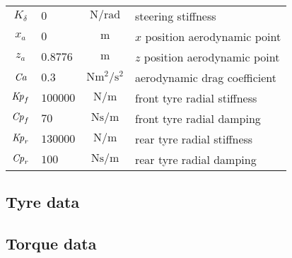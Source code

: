 \begin{longtable}{clcl}
$K_\delta$   & $0       $ & $\si{\newton/\radian}$         & steering stiffness                  \\
$x_a    $    & $0       $ & $\si{\metre}$                  & $x$ position aerodynamic point      \\
$z_a    $    & $0.8776  $ & $\si{\metre}$                  & $z$ position aerodynamic point      \\
$\it Ca $    & $0.3     $ & $\si{\newton\metre^2/\second^2}$ & aerodynamic drag coefficient      \\
${\it Kp}_f$ & $100000  $ & $\si{\newton/\metre}$          & front tyre radial stiffness         \\
${\it Cp}_f$ & $70      $ & $\si{\newton\second/\metre}$   & front tyre radial damping           \\
${\it Kp}_r$ & $130000  $ & $\si{\newton/\metre}$          & rear tyre radial stiffness          \\
${\it Cp}_r$ & $100     $ & $\si{\newton\second/\metre}$   & rear tyre radial damping            \\
\end{longtable}

%
\subsection*{Tyre data}
%
\subsection*{Torque data}
%

